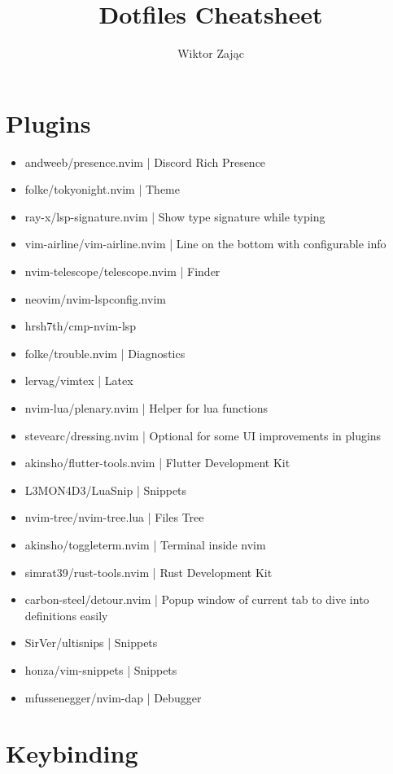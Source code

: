 \documentclass[12pt, a4paper]{article}
\title{Dotfiles Cheatsheet}
\author{Wiktor Zając}
\begin{document}
\maketitle
\vspace{5mm}
\tableofcontents

\section{Plugins}

\begin{itemize}
    \item andweeb/presence.nvim | Discord Rich Presence
    \item folke/tokyonight.nvim | Theme
    \item ray-x/lsp-signature.nvim | Show type signature while typing
    \item vim-airline/vim-airline.nvim | Line on the bottom with configurable info
    \item nvim-telescope/telescope.nvim | Finder
    \item neovim/nvim-lspconfig.nvim 
    \item hrsh7th/cmp-nvim-lsp
    \item folke/trouble.nvim | Diagnostics
    \item lervag/vimtex | Latex
    \item nvim-lua/plenary.nvim | Helper for lua functions
    \item stevearc/dressing.nvim | Optional for some UI improvements in plugins
    \item akinsho/flutter-tools.nvim | Flutter Development Kit
    \item L3MON4D3/LuaSnip | Snippets
    \item nvim-tree/nvim-tree.lua | Files Tree
    \item akinsho/toggleterm.nvim | Terminal inside nvim
    \item simrat39/rust-tools.nvim | Rust Development Kit
    \item carbon-steel/detour.nvim | Popup window of current tab to dive into definitions easily
    \item SirVer/ultisnips | Snippets
    \item honza/vim-snippets | Snippets
    \item mfussenegger/nvim-dap | Debugger
\end{itemize}

\section{Keybinding}
\end{document}
